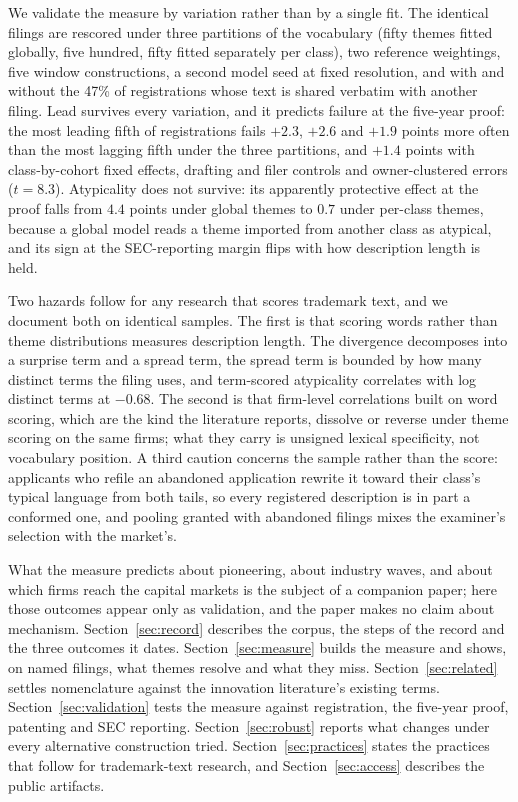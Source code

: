 We validate the measure by variation rather than by a single fit. The
identical filings are rescored under three partitions of the vocabulary
(fifty themes fitted globally, five hundred, fifty fitted separately per
class), two reference weightings, five window constructions, a second
model seed at fixed resolution, and with and without the 47\% of
registrations whose text is shared verbatim with another filing. Lead
survives every variation, and it predicts failure at the five-year proof:
the most leading fifth of registrations fails $+2.3$, $+2.6$ and $+1.9$
points more often than the most lagging fifth under the three partitions,
and $+1.4$ points with class-by-cohort fixed effects, drafting and filer
controls and owner-clustered errors ($t = 8.3$). Atypicality does not
survive: its apparently protective effect at the proof falls from $4.4$
points under global themes to $0.7$ under per-class themes, because a
global model reads a theme imported from another class as atypical, and
its sign at the SEC-reporting margin flips with how description length is
held.

Two hazards follow for any research that scores trademark text, and we
document both on identical samples. The first is that scoring words
rather than theme distributions measures description length. The
divergence decomposes into a surprise term and a spread term, the spread
term is bounded by how many distinct terms the filing uses, and
term-scored atypicality correlates with log distinct terms at $-0.68$.
The second is that firm-level correlations built on word scoring, which
are the kind the literature reports, dissolve or reverse under theme
scoring on the same firms; what they carry is unsigned lexical
specificity, not vocabulary position. A third caution concerns the sample
rather than the score: applicants who refile an abandoned application
rewrite it toward their class's typical language from both tails, so
every registered description is in part a conformed one, and pooling
granted with abandoned filings mixes the examiner's selection with the
market's.

What the measure predicts about pioneering, about industry waves, and
about which firms reach the capital markets is the subject of a companion
paper; here those outcomes appear only as validation, and the paper makes
no claim about mechanism. Section~\ref{sec:record} describes the corpus,
the steps of the record and the three outcomes it dates.
Section~\ref{sec:measure} builds the measure and shows, on named filings,
what themes resolve and what they miss. Section~\ref{sec:related} settles
nomenclature against the innovation literature's existing terms.
Section~\ref{sec:validation} tests the measure against registration, the
five-year proof, patenting and SEC reporting. Section~\ref{sec:robust}
reports what changes under every alternative construction tried.
Section~\ref{sec:practices} states the practices that follow for
trademark-text research, and Section~\ref{sec:access} describes the
public artifacts.
